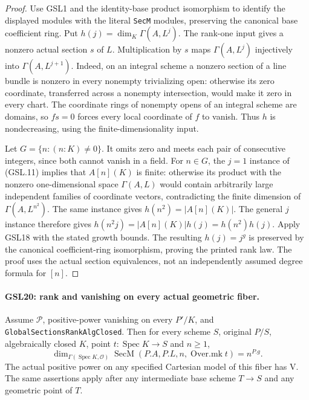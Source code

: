 \documentclass[11pt,a4paper]{article}
\numberwithin{equation}{section}
\theoremstyle{remark}\newtheorem{remark}[theorem]{Remark}
\begin{document}
\begin{proof}
Use GSL1 and the identity-base product isomorphism to identify
the displayed modules with the literal \texttt{Sec\allowbreak M} modules,
preserving the canonical base coefficient ring.  Put
$h(j)=\dim_K\Gamma(A,L^j)$.  The rank-one input gives a nonzero
actual section $s$ of $L$.  Multiplication by $s$ maps
$\Gamma(A,L^j)$ injectively into $\Gamma(A,L^{j+1})$.
Indeed, on an integral scheme a nonzero section of a line bundle
is nonzero in every nonempty trivializing open: otherwise its
zero coordinate, transferred across a nonempty intersection,
would make it zero in every chart.  The coordinate rings of
nonempty opens of an integral scheme are domains, so
$fs=0$ forces every local coordinate of $f$ to vanish.
Thus $h$ is nondecreasing, using the finite-dimensionality input.

Let $G=\{n:(n:K)\ne0\}$.  It omits zero and meets each pair
of consecutive integers, since both cannot vanish in a field.
For $n\in G$, the $j=1$ instance of (GSL.11) implies that
$A[n](K)$ is finite: otherwise its product with the nonzero
one-dimensional space $\Gamma(A,L)$ would contain arbitrarily
large independent families of coordinate vectors, contradicting
the finite dimension of $\Gamma(A,L^{n^2})$.
The same instance gives $h(n^2)=|A[n](K)|$.  The general $j$
instance therefore gives
$h(n^2j)=|A[n](K)|h(j)=h(n^2)h(j)$.
Apply GSL18 with the stated growth bounds.  The resulting
$h(j)=j^g$ is preserved by the canonical coefficient-ring
isomorphism, proving the printed rank law.  The proof uses the
actual section equivalences, not an independently assumed
degree formula for $[n]$.
\end{proof}

\paragraph{GSL20: rank and vanishing on every actual geometric fiber.}
\label{claim:GSL20}
Assume $\mathcal P$, positive-power vanishing on every $P'/K$,
and \texttt{Global\allowbreak Sections\allowbreak Rank\allowbreak Alg\allowbreak Closed}.  Then for every scheme
$S$, original $P/S$, algebraically closed $K$, point
$t:\operatorname{Spec}K\to S$ and $n\ge1$,
\[
 \dim_{\Gamma(\operatorname{Spec}K,\mathcal O)}
    \operatorname{SecM}(P.A,P.L,n,\operatorname{Over.mk}t)
       =n^{P.g}. \tag{GSL.12}
\]
The actual positive power on any specified Cartesian model of this
fiber has $\mathrm V$.  The same assertions apply after any
intermediate base scheme $T\to S$ and any geometric point of $T$.
\end{document}
